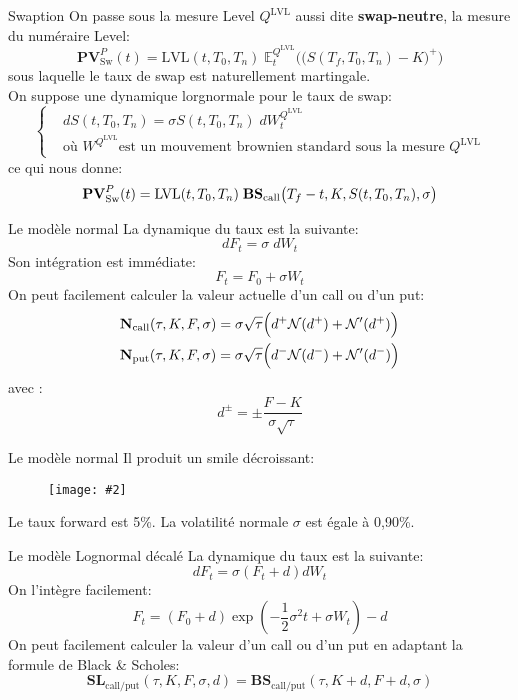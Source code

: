 \documentclass{beamer}
\newcommand{\FIG}[2]{\texttt{[image: \#2]}}
\begin{document}
\begin{frame}{Swaption}
On passe sous la mesure Level $Q^{\text{LVL}}$ aussi dite \textbf{swap-neutre}, la mesure du numéraire Level:
\[
\textbf{PV}_\text{Sw}^P(t)=\text{LVL}(t,T_0,T_n)\;\mathbb{E}_t^{Q^{\text{LVL}}}\Big(\big(S(T_f,T_0,T_n)-K\big)^+\Big)
\]
sous laquelle le taux de swap est naturellement martingale.\\
On suppose une dynamique lorgnormale pour le taux de swap:
\[
\left\{
\begin{split}
&dS(t,T_0,T_n)=\sigma S(t,T_0,T_n) \;dW_t^{Q^{\text{LVL}}}\\
&\text{où } W^{Q^{\text{LVL}}}\text{est un mouvement brownien standard sous la mesure }Q^{\text{LVL}}
\end{split}
\right.
\]
ce qui nous donne:
\[
\textbf{PV}_\text{Sw}^P(t)=\text{LVL}(t,T_0,T_n) \;\text{\textbf{BS}}_\text{call}\big(T_f-t,K,S(t,T_{0},T_n),\sigma\big)
\]
\end{frame}

\begin{frame}{Le modèle normal}
La dynamique du taux est la suivante:
\[
dF_t=\sigma\; dW_t
\]
Son intégration est immédiate:
\[
F_t = F_0 + \sigma W_t
\]
On peut facilement calculer la valeur actuelle d'un call ou d'un put:
\[
\begin{split}
&\text{\textbf{N}}_\text{call}(\tau,K,F,\sigma)=\sigma\sqrt{\tau}\Big(d^+\mathcal{N}(d^+)+\mathcal{N}'(d^+)\Big)\\
&\text{\textbf{N}}_\text{put}(\tau,K,F,\sigma)=\sigma\sqrt{\tau}\Big(d^-\mathcal{N}(d^-)+\mathcal{N}'(d^-)\Big)\\
\end{split}
\]
avec :
\[
d^\pm = \pm \frac{F-K}{\sigma\sqrt{\tau}}
\]
\end{frame}

\begin{frame}{Le modèle normal}
Il produit un smile décroissant:
\begin{figure}[h]
\FIG{8cm}{figures/smile_normal.jpg}
\end{figure}
Le taux forward est 5\%. La volatilité normale $\sigma$ est égale à 0,90\%. 
\end{frame}

\begin{frame}{Le modèle Lognormal décalé}
La dynamique du taux est la suivante:
\[
dF_t=\sigma (F_t + d)dW_t
\]
On l'intègre facilement:
\[
F_t = (F_0+d)\exp\left(-\frac{1}{2}\sigma^2t+\sigma W_{t} \right)-d
\]
On peut facilement calculer la valeur d'un call ou d'un put en adaptant la formule de Black \& Scholes:
\[
\mathbf{SL}_\text{call/put}(\tau,K,F,\sigma,d)=\mathbf{BS}_\text{call/put}(\tau,K+d,F+d,\sigma)
\]
\end{frame}
\end{document}
